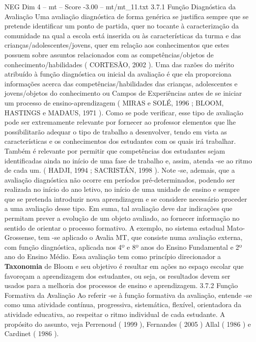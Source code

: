 \begin{textsample}{NEG Dim 4 – mt – Score -3.00 – mt/mt\_11.txt}  \label{ex:f4_neg_113}
3.7.1 Função Diagnóstica da Avaliação Uma avaliação diagnóstica de forma genérica se justifica sempre que se pretende identificar um ponto de partida, quer no tocante à caracterização da comunidade na qual a escola está inserida ou às características da turma e das crianças/adolescentes/jovens, quer em relação aos conhecimentos que estes possuem sobre assuntos relacionados com as competências/objetos de conhecimento/habilidades ( CORTESÃO, 2002 ).
Uma das razões do mérito atribuído à função diagnóstica ou inicial da avaliação é que ela proporciona informações acerca das competências/habilidades das crianças, adolescentes e jovens/objetos do conhecimento ou Campos de Experiências antes de se iniciar um processo de ensino-aprendizagem ( MIRAS e SOLÉ, 1996 ; BLOOM, HASTINGS e MADAUS, 1971 ).
Como se pode verificar, esse tipo de avaliação pode ser extremamente relevante por fornecer ao professor elementos que lhe possibilitarão adequar o tipo de trabalho a desenvolver, tendo em vista as características e os conhecimentos dos estudantes com os quais irá trabalhar.
Também é relevante por permitir que competências dos estudantes sejam identificadas ainda no início de uma fase de trabalho e, assim, atenda -se ao ritmo de cada um. ( HADJI, 1994 ; SACRISTÁN, 1998 ).
Note -se, ademais, que a avaliação diagnóstica não ocorre em períodos pré-determinados, podendo ser realizada no início do ano letivo, no início de uma unidade de ensino e sempre que se pretenda introduzir nova aprendizagem e se considere necessário proceder a uma avaliação desse tipo.
Em suma, tal avaliação deve dar indicações que permitam prever a evolução de um objeto avaliado, ao fornecer informação no sentido de orientar o processo formativo.
A exemplo, no sistema estadual Mato-Grossense, tem -se aplicado o Avalia MT, que consiste numa avaliação externa, com função diagnóstica, aplicada nos 4º e 8º anos do Ensino Fundamental e 2º ano do Ensino Médio.
Essa avaliação tem como princípio direcionador a \textbf{Taxonomia} de Bloom e seu objetivo é resultar em ações no espaço escolar que favoreçam a aprendizagem dos estudantes, ou seja, os resultados devem ser usados para a melhoria dos processos de ensino e aprendizagem. 3.7.2 Função Formativa da Avaliação Ao referir -se à função formativa da avaliação, entende -se como uma atividade contínua, progressiva, sistemática, flexível, orientadora da atividade educativa, ao respeitar o ritmo individual de cada estudante.
A propósito do assunto, veja Perrenoud ( 1999 ), Fernandes ( 2005 ) Allal ( 1986 ) e Cardinet ( 1986 ).

\end{textsample}
